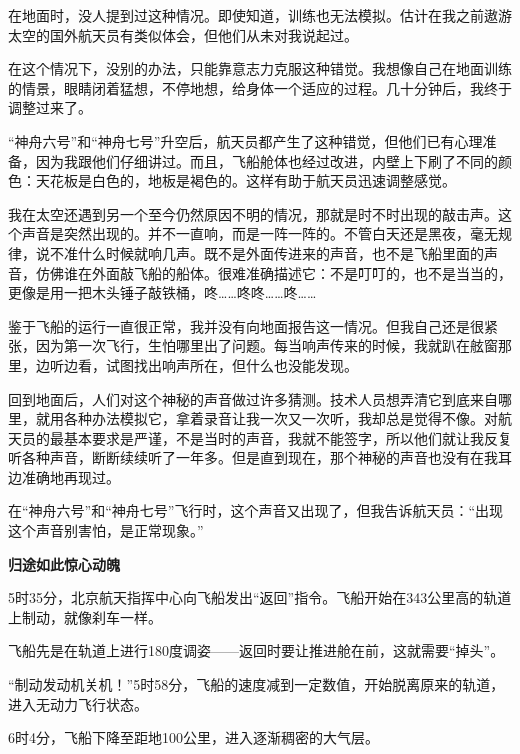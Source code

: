 \documentclass[12pt,UTF-8,openany]{ctexbook}
\begin{document}
\begin{large}
    在地面时，没人提到过这种情况。即使知道，训练也无法模拟。估计在我之前遨游太空的国外航天员有类似体会，但他们从未对我说起过。
    
    在这个情况下，没别的办法，只能靠意志力克服这种错觉。我想像自己在地面训练的情景，眼睛闭着猛想，不停地想，给身体一个适应的过程。几十分钟后，我终于调整过来了。
    
    “神舟六号”和“神舟七号”升空后，航天员都产生了这种错觉，但他们已有心理准备，因为我跟他们仔细讲过。而且，飞船舱体也经过改进，内壁上下刷了不同的颜色：天花板是白色的，地板是褐色的。这样有助于航天员迅速调整感觉。
    
    我在太空还遇到另一个至今仍然原因不明的情况，那就是时不时出现的敲击声。这个声音是突然出现的。并不一直响，而是一阵一阵的。不管白天还是黑夜，毫无规律，说不准什么时候就响几声。既不是外面传进来的声音，也不是飞船里面的声音，仿佛谁在外面敲飞船的船体。很难准确描述它：不是叮叮的，也不是当当的，更像是用一把木头锤子敲铁桶，咚……咚咚……咚……
    
    鉴于飞船的运行一直很正常，我并没有向地面报告这一情况。但我自己还是很紧张，因为第一次飞行，生怕哪里出了问题。每当响声传来的时候，我就趴在舷窗那里，边听边看，试图找出响声所在，但什么也没能发现。
    
    回到地面后，人们对这个神秘的声音做过许多猜测。技术人员想弄清它到底来自哪里，就用各种办法模拟它，拿着录音让我一次又一次听，我却总是觉得不像。对航天员的最基本要求是严谨，不是当时的声音，我就不能签字，所以他们就让我反复听各种声音，断断续续听了一年多。但是直到现在，那个神秘的声音也没有在我耳边准确地再现过。
    
    在“神舟六号”和“神舟七号”飞行时，这个声音又出现了，但我告诉航天员：“出现这个声音别害怕，是正常现象。”
    
    \begin{center}
    
    \begin{large}\textbf{归途如此惊心动魄}\end{large}
    
    \end{center}
    
    5时35分，北京航天指挥中心向飞船发出“返回”指令。飞船开始在343公里高的轨道上制动，就像刹车一样。
    
    飞船先是在轨道上进行180度调姿——返回时要让推进舱在前，这就需要“掉头”。
    
    “制动发动机关机！”5时58分，飞船的速度减到一定数值，开始脱离原来的轨道，进入无动力飞行状态。
    
    6时4分，飞船下降至距地100公里，进入逐渐稠密的大气层。
    

\end{large}
\end{document}
